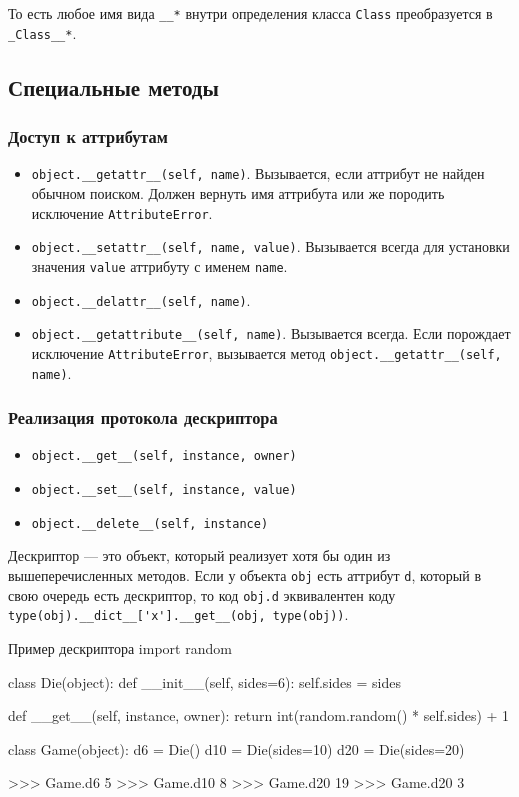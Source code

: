 То есть любое имя вида \lstinline{__*} внутри определения класса \lstinline{Class} преобразуется в \lstinline{_Class__*}.

\subsection{Специальные методы}

\subsubsection{Доступ к аттрибутам}
\begin{itemize}
  \item \lstinline{object.__getattr__(self, name)}. Вызывается, если аттрибут не найден обычном поиском. Должен вернуть имя аттрибута или же породить исключение \lstinline{AttributeError}.
  \item \lstinline{object.__setattr__(self, name, value)}. Вызывается всегда для установки значения \lstinline{value} аттрибуту с именем \lstinline{name}.
  \item \lstinline{object.__delattr__(self, name)}.
  \item \lstinline{object.__getattribute__(self, name)}. Вызывается всегда. Если порождает исключение \lstinline{AttributeError}, вызывается метод \lstinline{object.__getattr__(self, name)}.
\end{itemize}

\subsubsection{Реализация протокола дескриптора}
\begin{itemize}
  \item \lstinline{object.__get__(self, instance, owner)}
  \item \lstinline{object.__set__(self, instance, value)}
  \item \lstinline{object.__delete__(self, instance)}
\end{itemize}

Дескриптор --- это объект, который реализует хотя бы один из вышеперечисленных методов. Если у объекта \lstinline{obj} есть аттрибут \lstinline{d}, который в свою очередь есть дескриптор, то код \lstinline{obj.d} эквивалентен коду \lstinline{type(obj).__dict__['x'].__get__(obj, type(obj))}.

\begin{pylst}{Пример дескриптора}{}
import random

class Die(object):
    def __init__(self, sides=6):
        self.sides = sides

    def __get__(self, instance, owner):
        return int(random.random() * self.sides) + 1

class Game(object):
    d6 = Die()
    d10 = Die(sides=10)
    d20 = Die(sides=20)

>>> Game.d6
5
>>> Game.d10
8
>>> Game.d20
19
>>> Game.d20
3
\end{pylst}

